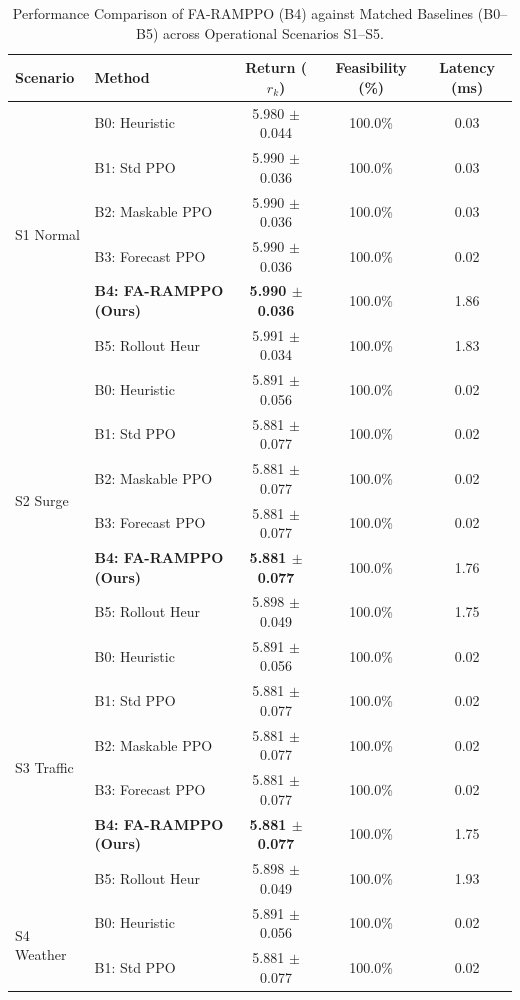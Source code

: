 \begin{table}[t]
\centering
\caption{Performance Comparison of FA-RAMPPO (B4) against Matched Baselines (B0--B5) across Operational Scenarios S1--S5.}
\label{tab:paper1_benchmark}
\begin{tabular}{llccc}
\toprule
\textbf{Scenario} & \textbf{Method} & \textbf{Return ($r_k$)} & \textbf{Feasibility (\%)} & \textbf{Latency (ms)} \\
\midrule
\multirow{6}{*}{S1 Normal} & B0: Heuristic & 5.980 $\pm$ 0.044 & 100.0\% & 0.03 \\
 & B1: Std PPO & 5.990 $\pm$ 0.036 & 100.0\% & 0.03 \\
 & B2: Maskable PPO & 5.990 $\pm$ 0.036 & 100.0\% & 0.03 \\
 & B3: Forecast PPO & 5.990 $\pm$ 0.036 & 100.0\% & 0.02 \\
 & \textbf{B4: FA-RAMPPO (Ours)} & \textbf{5.990 $\pm$ 0.036} & 100.0\% & 1.86 \\
 & B5: Rollout Heur & 5.991 $\pm$ 0.034 & 100.0\% & 1.83 \\
\midrule
\multirow{6}{*}{S2 Surge} & B0: Heuristic & 5.891 $\pm$ 0.056 & 100.0\% & 0.02 \\
 & B1: Std PPO & 5.881 $\pm$ 0.077 & 100.0\% & 0.02 \\
 & B2: Maskable PPO & 5.881 $\pm$ 0.077 & 100.0\% & 0.02 \\
 & B3: Forecast PPO & 5.881 $\pm$ 0.077 & 100.0\% & 0.02 \\
 & \textbf{B4: FA-RAMPPO (Ours)} & \textbf{5.881 $\pm$ 0.077} & 100.0\% & 1.76 \\
 & B5: Rollout Heur & 5.898 $\pm$ 0.049 & 100.0\% & 1.75 \\
\midrule
\multirow{6}{*}{S3 Traffic} & B0: Heuristic & 5.891 $\pm$ 0.056 & 100.0\% & 0.02 \\
 & B1: Std PPO & 5.881 $\pm$ 0.077 & 100.0\% & 0.02 \\
 & B2: Maskable PPO & 5.881 $\pm$ 0.077 & 100.0\% & 0.02 \\
 & B3: Forecast PPO & 5.881 $\pm$ 0.077 & 100.0\% & 0.02 \\
 & \textbf{B4: FA-RAMPPO (Ours)} & \textbf{5.881 $\pm$ 0.077} & 100.0\% & 1.75 \\
 & B5: Rollout Heur & 5.898 $\pm$ 0.049 & 100.0\% & 1.93 \\
\midrule
\multirow{6}{*}{S4 Weather} & B0: Heuristic & 5.891 $\pm$ 0.056 & 100.0\% & 0.02 \\
 & B1: Std PPO & 5.881 $\pm$ 0.077 & 100.0\% & 0.02 \\

\end{tabular}
\end{table}
